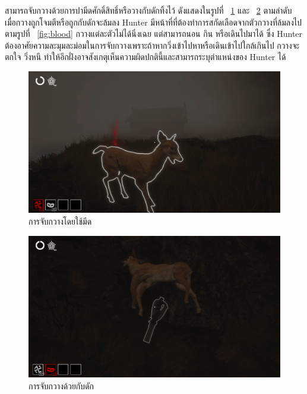 สามารถจับกวางด้วยการปามีดศักดิ์สิทธิ์หรือวางกับดักทิ้งไว้ ดังแสดงในรูปที่ ~\ref{fig:การจับกวางโดยใช้มีด} และ ~\ref{fig:trap} ตามลำดับ เมื่อกวางถูกโจมตีหรือถูกกับดักจะล้มลง Hunter มีหน้าที่ที่ต้องทำการสกัดเลือดจากตัวกวางที่ล้มลงไปตามรูปที่ ~\ref{fig:blood}
กวางแต่ละตัวไม่ได้นิ่งเฉย แต่สามารถนอน กิน หรือเดินไปมาได้ ซึ่ง
Hunter ต้องอาศัยความละมุมละม่อมในการจับกวางเพราะถ้าหากวิ่งเข้าไปหาหรือเดินเข้าไปใกล้เกินไป กวางจะตกใจ
วิ่งหนี ทำให้อีกฝั่งอาจสังเกตุเห็นความผิดปกตินี้และสามารถระบุตำแหน่งของ Hunter ได้

\begin{figure}[h]
  \begin{center}
  \includegraphics[width=\textwidth]{./img/mechanics/throw_knife_deer.png}
  \end{center}
    \caption[การจับกวางโดยใช้มีด]{การจับกวางโดยใช้มีด}
    \label{fig:การจับกวางโดยใช้มีด}
\end{figure}

\begin{figure}[p]
  \begin{center}
  \includegraphics[width=\textwidth]{./img/mechanics/deer_trapped.png}
  \end{center}
    \caption[การจับกวางด้วยกับดัก]{การจับกวางด้วยกับดัก}
    \label{fig:trap}
\end{figure}

